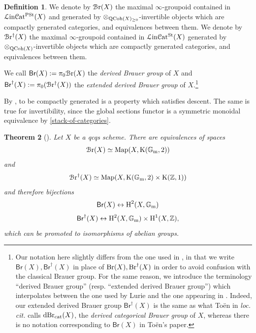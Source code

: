 \documentclass[11pt, twoside]{article} %
\numberwithin{equation}{section}
\theoremstyle{plain}
\newtheorem{thm}{Theorem}[section]
\theoremstyle{definition}
\newtheorem{defin}[thm]{Definition}
\newcommand{\Z}{\mathbb Z}
\newcommand{\tK}{\textup{K}}
\newcommand{\Map}{\textup{Map}}
\newcommand{\Gm}{\mathbb G_{\mathrm{m}}}
\newcommand{\QCoh}{\textup{QCoh}}
\newcommand{\tH}{\textup{H}}
\newcommand{\Br}{\mathsf{Br}}
\newcommand{\cBr}{\mathcal{B}\textup{r}}
\newcommand{\Bre}{\mathsf{Br}^\dagger}
\newcommand{\cBre}{\mathcal{B}\textup{r}^\dagger}
\newcommand{\Lin}{\mathcal L\textup{in}\mathcal{C}\textup{at}^{\textup{St}}}
\newcommand{\Linpre}{{\mathcal L\textup{in}\mathcal{C}\textup{at}^{\textup{PSt}}}}
\begin{document}
	\begin{defin}\label{defin-derived-Brauer}We denote by $\cBr(X)$ the maximal $\infty$-groupoid contained in $\Linpre(X)$ and generated by $\otimes_{\QCoh(X)_{\geq 0}}$-invertible objects which are compactly generated categories, and equivalences between them. We denote by $\cBre(X)$ the maximal $\infty$-groupoid contained in $\Lin(X)$ generated by $\otimes_{\QCoh(X)}$-invertible objects which are compactly generated categories, and equivalences between them.
	
	We call $\Br(X):=\pi_0\cBr(X)$ the \textit{derived Brauer group} of $X$ and $\Bre(X):=\pi_0(\cBre(X))$ the \textit{extended derived Brauer group} of $X$.\footnote{Our notation here slightly differs from the one used in \cite[Definition 11.5.2.1, Definition 11.5.7.1]{SAG}, in that we write $\Br(X),\Bre(X)$ in place of $\textup{Br}(X),\textup{Br}^\dagger(X)$ in order to avoid confusion with the classical Brauer group. For the same reason, we introduce the terminology ``derived Brauer group'' (resp. ``extended derived Brauer group'') which interpolates between the one used by Lurie and the one appearing in \cite[Definition 2.14]{Toen-Azumaya}. Indeed, our extended derived Brauer group $\Bre(X)$ is the same as what To\"en in \textit{loc. cit.} calls $\textup{dBr}_{\textup{cat}}(X)$, the \textit{derived categorical Brauer group} of $X$, whereas there is no notation corresponding to $\Br(X)$ in To\"en's paper.}
	\end{defin}
	
	By \cite[Theorem 10.3.2.1]{SAG}, to be compactly generated is a property which satisfies descent. The same is true for invertibility, since the global sections functor is a symmetric monoidal equivalence by \cref{stack-of-categories}.

 \begin{thm}[{\cite[Example 11.5.7.15 and Example 11.5.5.5]{SAG}}]\label{cohomological-interpretation-brauer}
     Let $X$ be a qcqs scheme. There are equivalences of spaces $$\cBr(X)\simeq \Map(X, \tK(\Gm, 2))$$ and $$\cBre(X)\simeq \Map(X,\tK(\Gm,2)\times \tK(\Z, 1))$$ and therefore bijections $$\Br(X)\leftrightarrow \tH^2(X,\Gm)$$
     $$\Bre(X)\leftrightarrow \tH^2(X,\Gm)\times \tH^1(X,\Z),$$ which can be promoted to isomorphisms of abelian groups.
 \end{thm}
\end{document}
